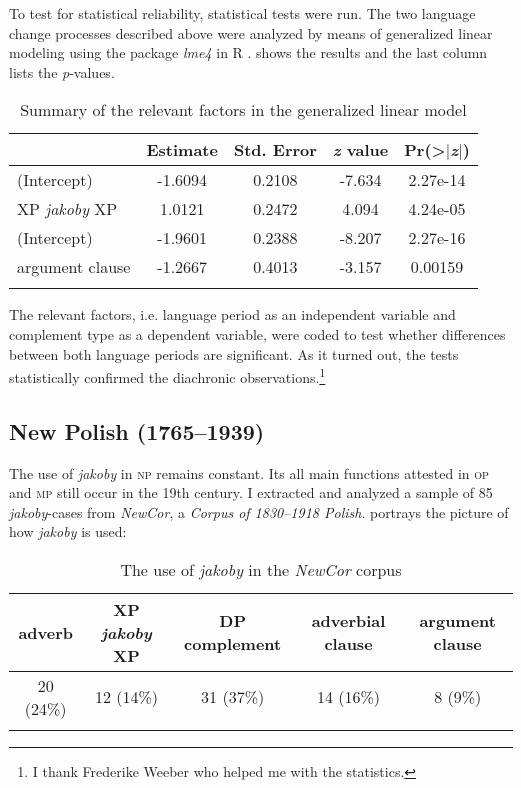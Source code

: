 \documentclass[output=paper
,modfonts
,nonflat]{langsci/langscibook}
\begin{document}
To test for statistical reliability, statistical tests were run. The two language change processes described above were analyzed by means of generalized linear modeling using the package \emph{lme4} \citep{Bates-Maechler-etal2012} in R \citep{Team2012}.  shows the results and the last column lists the \emph{p}-values.

 \begin{table}[h] \begin{tabular}{l*{3}{S[table-format=-1.5]}S[table-format=1.2e4]} 
\lsptoprule
{} & {Estimate} & {Std. Error} & {\emph{z} value} & {Pr(>$\mid$\emph{z}$\mid$)} \\
\midrule
(Intercept) & -1.6094 & 0.2108 & -7.634 & 2.27e-14 \\  
XP \emph{jakoby} XP & 1.0121 & 0.2472 & 4.094 & 4.24e-05 \\
(Intercept) & -1.9601 & 0.2388 & -8.207 & 2.27e-16 \\
argument clause & -1.2667 & 0.4013 & -3.157 & 0.00159 \\
 \lspbottomrule
\end{tabular}
\caption{Summary of the relevant factors in the generalized linear model} \label{static}
\end{table}

\noindent  The relevant factors, i.e. language period as an independent variable and complement type as a dependent variable, were coded to test whether differences between both language periods are significant. As it turned out, the tests statistically confirmed the diachronic observations.\footnote{I thank Frederike Weeber who helped me with the statistics.
}
 
\subsection{New Polish (1765--1939)}

The use of \emph{jakoby} in \textsc{np} remains constant. Its all main functions attested in \textsc{op} and \textsc{mp} still occur in the 19th century. I extracted and analyzed a sample of 85 \emph{jakoby}-cases from \emph{NewCor}, a \emph{Corpus of 1830--1918 Polish}.  portrays the picture of how \emph{jakoby} is used:       

\begin{table}[h] 
\begin{tabular}{ccccc} 
 \lsptoprule
adverb & XP \emph{jakoby} XP & DP complement  & adverbial clause & argument clause \\
\midrule
 20 (24\%) & 12 (14\%) & 31 (37\%) & 14 (16\%) & 8 (9\%)  \\
 \lspbottomrule
\end{tabular}
\caption{The use of \emph{jakoby} in the \emph{NewCor} corpus} \label{nowopolski_statystka}
\end{table}
\end{document}
